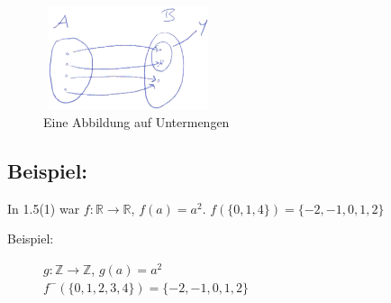 		\begin{figure} [H]
		\centering 
		\includegraphics[width=5cm, height=3cm]{mainmatter/chapter1/pics/untermengen1.png}
		\caption{Eine Abbildung auf Untermengen} 
		\end{figure}
\subsection{Beispiel:}
In 1.5(1) war $f: \mathbb{R} \rightarrow \mathbb{R}$, $f(a)=a^{2}$.
$f(\{0,1,4\}) = \{-2,-1,0,1,2\}$

\begin{description}

	\item[Beispiel:] $g:\mathbb{Z} \rightarrow \mathbb{Z}$, $g(a)=a^{2}$ \\
	$f^{-}(\{0,1,2,3,4\}) = \{-2,-1,0,1,2\}$

\end{description}

